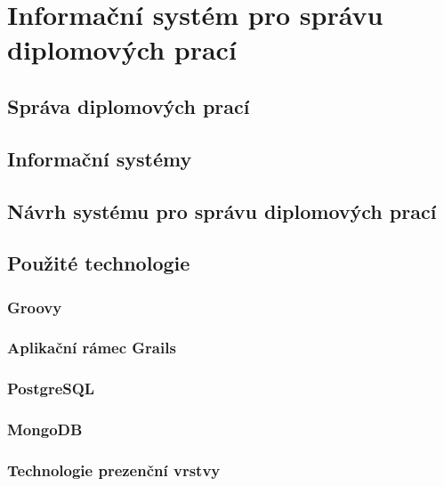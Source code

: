 \chapter{Informační systém pro správu diplomových prací}

\section{Správa diplomových prací}
\blindtext

\section{Informační systémy}
\blindtext

\section{Návrh systému pro správu diplomových prací}
\blindtext

\section{Použité technologie}

\subsection{Groovy}
\blindtext

\subsection{Aplikační rámec Grails}
\blindtext

\subsection{PostgreSQL}
\blindtext

\subsection{MongoDB}
\blindtext

\subsection{Technologie prezenční vrstvy}
\blindtext
